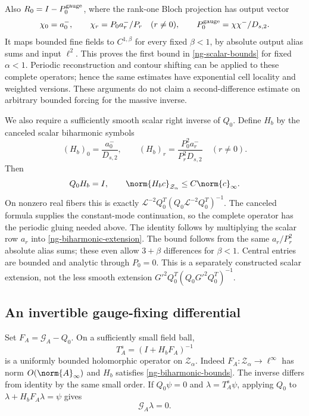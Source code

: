 Also $R_0=I-P_0^{\rm gauge}$, where the rank-one Bloch projection
has output vector
\[
 \chi_0=a_0^-,\qquad \chi_r=P_0a_r^-/P_r\quad(r\ne0),
 \qquad P_0^{\rm gauge}=\chi\chi^-/D_{s,2}.
\]
It maps bounded fine fields to $C^{1,\beta}$ for every fixed
$\beta<1$, by absolute output alias sums and input $\ell^2$.
This proves the first bound in \eqref{ng-scalar-bounds} for fixed
$\alpha<1$. Periodic reconstruction and contour shifting can
be applied to these complete operators; hence the same estimates
have exponential cell locality and weighted versions. These
arguments do not claim a second-difference estimate on arbitrary
bounded forcing for the massive inverse.

We also require a sufficiently smooth scalar right inverse of
$Q_0$. Define $H_b$ by the canceled scalar biharmonic symbols
\begin{equation}\label{ng-biharmonic-extension}
 (H_b)_0=\frac{a_0^-}{D_{s,2}},\qquad
 (H_b)_r=\frac{P_0^2a_r^-}{P_r^2D_{s,2}}\quad(r\ne0).
\end{equation}
Then
\begin{equation}\label{ng-biharmonic-bounds}
 Q_0H_b=I,\qquad
 \norm{H_bc}_{\mathcal Z_\alpha}\le C\norm{c}_\infty.
\end{equation}
On nonzero real fibers this is exactly
$\mathcal L^{-2}Q_0^T(Q_0\mathcal L^{-2}Q_0^T)^{-1}$.
The canceled formula supplies the constant-mode continuation, so
the complete operator has the periodic gluing needed above.
The identity follows by multiplying the scalar row $a_r$ into
\eqref{ng-biharmonic-extension}. The bound follows from the
same $a_r/P_r^2$ absolute alias sums; these even allow $3+\beta$
differences for $\beta<1$. Central entries are bounded and analytic
through $P_0=0$. This is a separately constructed scalar extension,
not the less smooth extension $G'^2Q_0^T(Q_0G'^2Q_0^T)^{-1}$.

\subsection{An invertible gauge-fixing differential}

Set $F_A=\mathcal G_A-Q_0$. On a sufficiently small field ball,
\begin{equation}\label{ng-scalar-chart}
 T_A^s=(I+H_bF_A)^{-1}
\end{equation}
is a uniformly bounded holomorphic operator on $\mathcal Z_\alpha$.
Indeed $F_A:\mathcal Z_\alpha\to\ell^\infty$ has norm
$O(\norm{A}_\infty)$ and $H_b$ satisfies
\eqref{ng-biharmonic-bounds}. The inverse differs from identity
by the same small order. If $Q_0\psi=0$ and
$\lambda=T_A^s\psi$, applying $Q_0$ to
$\lambda+H_bF_A\lambda=\psi$ gives
\begin{equation}\label{ng-scalar-kernel}
 \mathcal G_A\lambda=0.
\end{equation}

